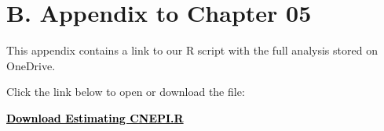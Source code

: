 \documentclass[12pt,a4paper]{report} %
\begin{document}
\section*{B. Appendix to Chapter 05}
This appendix contains a link to our R script with the full analysis stored on OneDrive.


\begin{tcolorbox}[colback=gray!10, colframe=black, width=0.95\linewidth, sharp corners, boxrule=0.8mm, title={\faFileCode~R Script Preview}]
	\centering
	Click the link below to open or download the file:
	
	\href{https://1drv.ms/u/c/5052e625e7f51e50/EcsEFY5C1YRDq0fjz8jZahsBZrp3K-bhtD9727I739Jcrg?e=LCo3bv}{\textbf{\textcolor{black}{Download Estimating CNEPI.R}}}
\end{tcolorbox}


		
	
\clearpage
\end{document}
